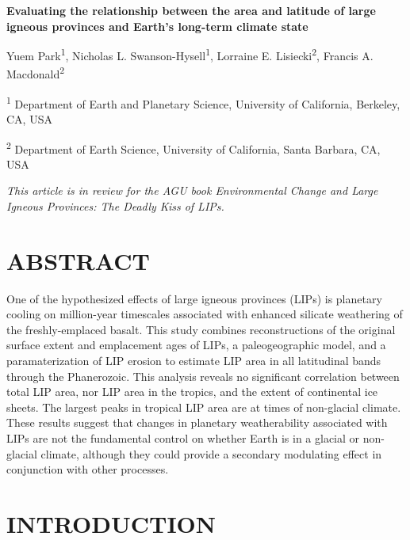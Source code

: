 \documentclass[11pt,letterpaper]{article}
\begin{document}
\begin{flushleft}
{\Large \textbf{Evaluating the relationship between the area and latitude of large igneous provinces and Earth's long-term climate state}}

Yuem Park\textsuperscript{1},
Nicholas L. Swanson-Hysell\textsuperscript{1},
Lorraine E. Lisiecki\textsuperscript{2},
Francis A. Macdonald\textsuperscript{2}

\bigskip
\textsuperscript{1} Department of Earth and Planetary Science, University of California, Berkeley, CA, USA

\textsuperscript{2} Department of Earth Science, University of California, Santa Barbara, CA, USA
\bigskip

\end{flushleft}

\noindent\textit{This article is in review for the AGU book \textit{Environmental Change and Large Igneous Provinces: The Deadly Kiss of LIPs}.}

\linenumbers

\section*{ABSTRACT \label{sec:ABSTRACT}}

One of the hypothesized effects of large igneous provinces (LIPs) is planetary cooling on million-year timescales associated with enhanced silicate weathering of the freshly-emplaced basalt. This study combines reconstructions of the original surface extent and emplacement ages of LIPs, a paleogeographic model, and a paramaterization of LIP erosion to estimate LIP area in all latitudinal bands through the Phanerozoic. This analysis reveals no significant correlation between total LIP area, nor LIP area in the tropics, and the extent of continental ice sheets. The largest peaks in tropical LIP area are at times of non-glacial climate. These results suggest that changes in planetary weatherability associated with LIPs are not the fundamental control on whether Earth is in a glacial or non-glacial climate, although they could provide a secondary modulating effect in conjunction with other processes.

\section*{INTRODUCTION \label{sec:INTRODUCTION}}
\end{document}
